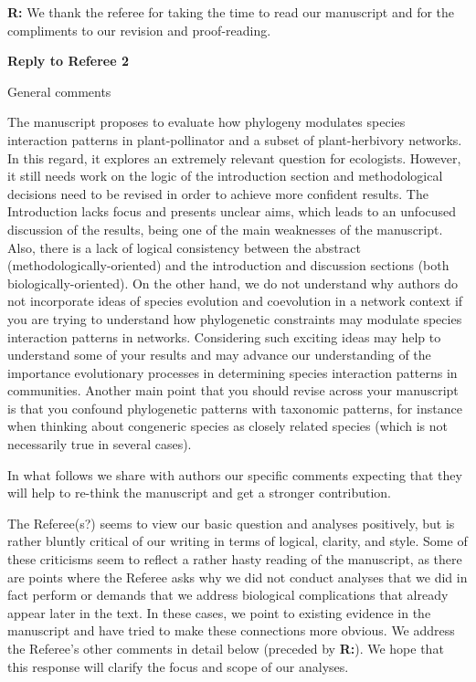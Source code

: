 \documentclass[12pt]{letter}
\newenvironment{refquote}{\bigskip \begin{it}}{\end{it}\smallskip}
\begin{document}
	\textbf{R:} We thank the referee for taking the time to read our manuscript and for the compliments to our revision and proof-reading.


\clearpage

{\Large \bf Reply to Referee 2}


	\begin{refquote}
	General comments

	The manuscript proposes to evaluate how phylogeny modulates species interaction patterns in plant-pollinator and a subset of plant-herbivory networks. In this regard, it explores an extremely relevant question for ecologists. However, it still needs work on the logic of the introduction section and methodological decisions need to be revised in order to achieve more confident results. The Introduction lacks focus and presents unclear aims, which leads to an unfocused discussion of the results, being one of the main weaknesses of the manuscript. Also, there is a lack of logical consistency between the abstract (methodologically-oriented) and the introduction and discussion sections (both biologically-oriented). On the other hand, we do not understand why authors do not incorporate ideas of species evolution and coevolution in a network context if you are trying to understand how phylogenetic constraints may modulate species interaction patterns in networks. Considering such exciting ideas may help to understand some of your results and may advance our understanding of  the importance evolutionary processes in determining species interaction patterns in communities.
	Another main point that you should revise across your manuscript is that you confound phylogenetic patterns with taxonomic patterns, for instance when thinking about congeneric species as closely related species (which is not necessarily true in several cases).

	\smallskip

	In what follows we share with authors our specific comments expecting that they will help to re-think the manuscript and get a stronger contribution.

	\end{refquote}


	The Referee(s?) seems to view our basic question and analyses positively, but is rather bluntly critical of our writing in terms of logical, clarity, and style. Some of these criticisms seem to reflect a rather hasty reading of the manuscript, as there are points where the Referee asks why we did not conduct analyses that we did in fact perform or demands that we address biological complications that already appear later in the text. In these cases, we point to existing evidence in the manuscript and have tried to make these connections more obvious. We address the Referee's other comments in detail below (preceded by \textbf{R:}). We hope that this response will clarify the focus and scope of our analyses.
\end{document}
